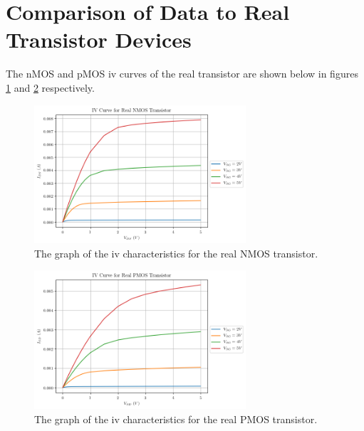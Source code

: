 \documentclass[titlepage, 12pt]{article}
\begin{document}
    \section{Comparison of Data to Real Transistor Devices}
    The nMOS and pMOS iv curves of the real transistor are shown below
    in figures \ref{fig:real_n} and \ref{fig:real_p} respectively.
    \begin{figure}[H]
        \centering
        \includegraphics[width=0.7\textwidth]{figures/part_3_nmos.png}
        \caption{The graph of the iv characteristics for the real NMOS
        transistor.}
        \label{fig:real_n}
    \end{figure}
    \begin{figure}[H]
        \centering
        \includegraphics[width=0.7\textwidth]{figures/part_3_pmos.png}
        \caption{The graph of the iv characteristics for the real PMOS
        transistor.}
        \label{fig:real_p}
    \end{figure}
\end{document}
